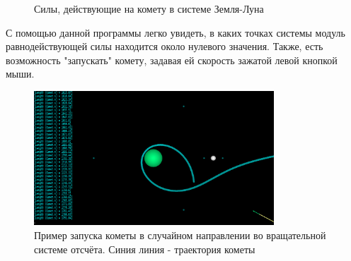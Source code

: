 \documentclass[a4paper,12pt]{article}
\begin{document}
\begin{figure}[H]
    \centering
    \caption{Силы, действующие на комету в системе Земля-Луна}
    \label{}
\end{figure}

С помощью данной программы легко увидеть, в каких точках системы модуль равнодействующей силы находится около нулевого значения. Также, есть возможность "запускать"
комету, задавая ей скорость зажатой левой кнопкой мыши.  
\begin{figure}[H]
    \begin{center}
	\includegraphics[width=0.8\textwidth]{example_1.png}
	\caption{Пример запуска кометы в случайном направлении во вращательной системе отсчёта. Синия линия - траектория кометы}
    \end{center}
\end{figure}
\end{document}

